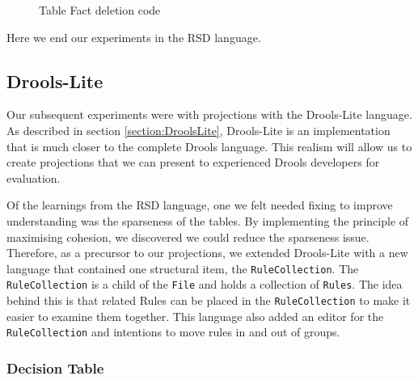 \begin{figure}
    \centering
    \caption{Table Fact deletion code}
    \label{fig:tableFactDeletion}
\end{figure}

Here we end our experiments in the RSD language.

\newpage

\subsection{Drools-Lite}

Our subsequent experiments were with projections with the Drools-Lite language.
As described in section \ref{section:DroolsLite}, Drools-Lite is an implementation that is much closer to the complete Drools language.
This realism will allow us to create projections that we can present to experienced Drools developers for evaluation.

Of the learnings from the RSD language, one we felt needed fixing to improve understanding was the sparseness of the tables.
By implementing the principle of maximising cohesion, we discovered we could reduce the sparseness issue.
Therefore, as a precursor to our projections, we extended Drools-Lite with a new language that contained one structural item, the \texttt{RuleCollection}.
The \texttt{RuleCollection} is a child of the \texttt{File} and holds a collection of \texttt{Rules}.
The idea behind this is that related Rules can be placed in the \texttt{RuleCollection} to make it easier to examine them together.
This language also added an editor for the \texttt{RuleCollection} and intentions to move rules in and out of groups.

\subsubsection{Decision Table}


